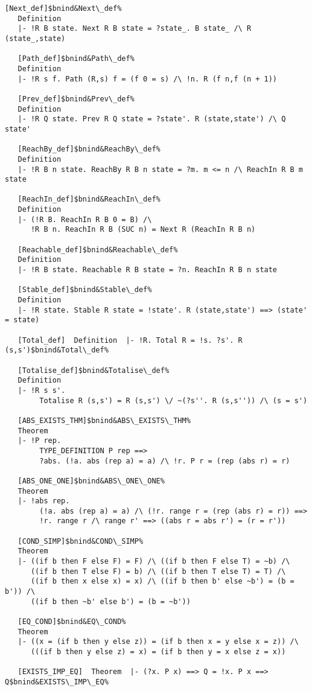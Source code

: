 \documentclass[12pt]{article}
\begin{document}
\begin{footnotesize}
\begin{Verbatim}[commandchars=\$\&\%]
   [Next_def]$bnind&Next\_def%
   Definition
   |- !R B state. Next R B state = ?state_. B state_ /\ R (state_,state)
   
   [Path_def]$bnind&Path\_def%
   Definition
   |- !R s f. Path (R,s) f = (f 0 = s) /\ !n. R (f n,f (n + 1))
   
   [Prev_def]$bnind&Prev\_def%
   Definition
   |- !R Q state. Prev R Q state = ?state'. R (state,state') /\ Q state'
   
   [ReachBy_def]$bnind&ReachBy\_def%
   Definition
   |- !R B n state. ReachBy R B n state = ?m. m <= n /\ ReachIn R B m state
   
   [ReachIn_def]$bnind&ReachIn\_def%
   Definition
   |- (!R B. ReachIn R B 0 = B) /\
      !R B n. ReachIn R B (SUC n) = Next R (ReachIn R B n)
   
   [Reachable_def]$bnind&Reachable\_def%
   Definition
   |- !R B state. Reachable R B state = ?n. ReachIn R B n state
   
   [Stable_def]$bnind&Stable\_def%
   Definition 
   |- !R state. Stable R state = !state'. R (state,state') ==> (state' = state)
   
   [Total_def]  Definition  |- !R. Total R = !s. ?s'. R (s,s')$bnind&Total\_def%
   
   [Totalise_def]$bnind&Totalise\_def%
   Definition
   |- !R s s'.
        Totalise R (s,s') = R (s,s') \/ ~(?s''. R (s,s'')) /\ (s = s')
   
   [ABS_EXISTS_THM]$bnind&ABS\_EXISTS\_THM%
   Theorem
   |- !P rep.
        TYPE_DEFINITION P rep ==>
        ?abs. (!a. abs (rep a) = a) /\ !r. P r = (rep (abs r) = r)
   
   [ABS_ONE_ONE]$bnind&ABS\_ONE\_ONE%
   Theorem
   |- !abs rep.
        (!a. abs (rep a) = a) /\ (!r. range r = (rep (abs r) = r)) ==>
        !r. range r /\ range r' ==> ((abs r = abs r') = (r = r'))
   
   [COND_SIMP]$bnind&COND\_SIMP%
   Theorem
   |- ((if b then F else F) = F) /\ ((if b then F else T) = ~b) /\
      ((if b then T else F) = b) /\ ((if b then T else T) = T) /\
      ((if b then x else x) = x) /\ ((if b then b' else ~b') = (b = b')) /\
      ((if b then ~b' else b') = (b = ~b'))
   
   [EQ_COND]$bnind&EQ\_COND%
   Theorem
   |- ((x = (if b then y else z)) = (if b then x = y else x = z)) /\
      (((if b then y else z) = x) = (if b then y = x else z = x))
   
   [EXISTS_IMP_EQ]  Theorem  |- (?x. P x) ==> Q = !x. P x ==> Q$bnind&EXISTS\_IMP\_EQ%
   

\end{Verbatim}
\end{footnotesize}
\end{document}
